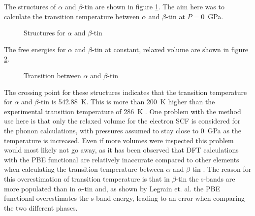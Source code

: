 \documentclass[12pt]{article}
\begin{document}
The structures of $\alpha$ and $\beta$-tin are shown in figure \ref{fig:alpha_and_beta_tin}. The aim here was to calculate the transition temperature between $\alpha$ and $\beta$-tin at $P=$\SI{0}{\giga\pascal}.
\begin{figure}
	\centering
	\qquad
	\qquad
	\caption{Structures for $\alpha$ and $\beta$-tin}
	\label{fig:alpha_and_beta_tin}
\end{figure}

The free energies for $\alpha$ and $\beta$-tin at constant, relaxed volume are shown in figure \ref{fig:sn_transition}.

\begin{figure}
	\centering
	
	\caption{Transition between $\alpha$ and $\beta$-tin}
	\label{fig:sn_transition}
\end{figure}

The crossing point for these structures indicates that the transition temperature for $\alpha$ and $\beta$-tin is \SI{542.88}{\kelvin}. This is more than \SI{200}{\kelvin} higher than the experimental transition temperature of \SI{286}{\kelvin} \cite{Raynor101}. 
One problem with the method use here is that only the relaxed volume for the electron SCF is considered for the phonon calculations, with pressures assumed to stay close to \SI{0}{\giga\pascal} as the temperature is increased.
Even if more volumes were inspected this problem would most likely not go away, as it has been observed that DFT calculations with the PBE functional are relatively inaccurate compared to other elements when calculating the transition temperature between $\alpha$ and $\beta$-tin \cite{legrain2016understanding}. The reason for this overestimation of transition temperature is that in $\beta$-tin the s-bands are more populated than in $\alpha$-tin and, as shown by Legrain et. al. the PBE functional overestimates the s-band energy, leading to an error when comparing the two different phases.
\end{document}
